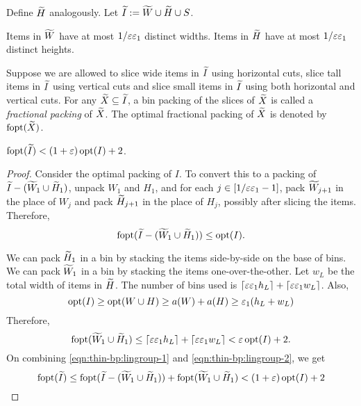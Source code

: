 Define $\widetilde{H}$ analogously. Let $\widetilde{I} := \widetilde{W} \cup \widetilde{H} \cup S$.

\begin{claim}
\label{thm:thin-bp:lingroup-distinct}
Items in $\widetilde{W}$ have at most $1/\varepsilon\varepsilon_1$ distinct widths.
Items in $\widetilde{H}$ have at most $1/\varepsilon\varepsilon_1$ distinct heights.
\end{claim}

\begin{definition}
Suppose we are allowed to slice wide items in $\widetilde{I}$ using horizontal cuts,
slice tall items in $\widetilde{I}$ using vertical cuts and slice
small items in $\widetilde{I}$ using both horizontal and vertical cuts.
For any $\widetilde{X} \subseteq \widetilde{I}$, a bin packing of the slices of $\widetilde{X}$
is called a \emph{fractional packing} of $\widetilde{X}$.
The optimal fractional packing of $\widetilde{X}$ is denoted by $\operatorname{fopt}(\widetilde{X})$.
\end{definition}

\begin{lemma}
\label{thm:thin-bp:lingroup-opt-compare}
$\operatorname{fopt}(\widetilde{I}) < (1+\varepsilon)\operatorname{opt}(I) + 2$.
\end{lemma}
\begin{proof}
Consider the optimal packing of $I$.
To convert this to a packing of $\widetilde{I} - (\widetilde{W}_1 \cup \widetilde{H}_1)$,
unpack $W_1$ and $H_1$, and for each $j \in [1/\varepsilon\varepsilon_1-1]$,
pack $\widetilde{W}_{j+1}$ in the place of $W_j$
and pack $\widetilde{H}_{j+1}$ in the place of $H_j$,
possibly after slicing the items.
Therefore,
\begin{equation}
\label{eqn:thin-bp:lingroup-1}
\operatorname{fopt}(\widetilde{I} - (\widetilde{W}_1 \cup \widetilde{H}_1)) \le \operatorname{opt}(I).
\end{equation}

We can pack $\widetilde{H}_1$ in a bin by stacking the items side-by-side on the base of bins.
We can pack $\widetilde{W}_1$ in a bin by stacking the items one-over-the-other.
Let $w_L$ be the total width of items in $\widetilde{H}$. The number of bins used is
$\lceil \varepsilon\varepsilon_1 h_L \rceil + \lceil \varepsilon\varepsilon_1 w_L \rceil$. Also,
\[ \operatorname{opt}(I) \ge \operatorname{opt}(W \cup H)
\ge a(W) + a(H) \ge \varepsilon_1(h_L + w_L) \]
Therefore,
\begin{equation}
\label{eqn:thin-bp:lingroup-2}
\operatorname{fopt}(\widetilde{W}_1 \cup \widetilde{H}_1)
\le \lceil \varepsilon\varepsilon_1 h_L \rceil + \lceil \varepsilon\varepsilon_1 w_L \rceil < \varepsilon\operatorname{opt}(I) + 2.
\end{equation}
On combining \eqref{eqn:thin-bp:lingroup-1} and \eqref{eqn:thin-bp:lingroup-2}, we get
\[ \operatorname{fopt}(\widetilde{I}) \le \operatorname{fopt}(\widetilde{I} - (\widetilde{W}_1 \cup \widetilde{H}_1))
    + \operatorname{fopt}(\widetilde{W}_1 \cup \widetilde{H}_1)
< (1+\varepsilon)\operatorname{opt}(I) + 2 \qedhere \]
\end{proof}
